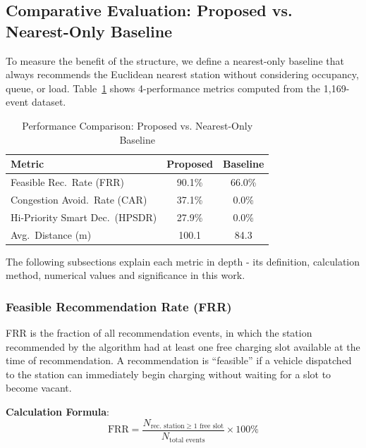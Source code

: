 \documentclass[conference]{IEEEtran}
\begin{document}
\subsection{Comparative Evaluation: Proposed vs. Nearest-Only Baseline}

To measure the benefit of the structure, we define a nearest-only
baseline that always recommends the Euclidean nearest station without
considering occupancy, queue, or load. Table~\ref{tab:comparison} shows
4-performance metrics computed from the 1,169-event dataset.

\begin{table}[htbp]
\caption{Performance Comparison: Proposed vs. Nearest-Only Baseline}
\label{tab:comparison}
\begin{center}
\begin{tabular}{|l|c|c|}
\hline
\textbf{Metric} & \textbf{Proposed} & \textbf{Baseline} \\
\hline
Feasible Rec.\ Rate (FRR)       & 90.1\% & 66.0\% \\
\hline
Congestion Avoid.\ Rate (CAR)   & 37.1\% &  0.0\% \\
\hline
Hi-Priority Smart Dec.\ (HPSDR) & 27.9\% &  0.0\% \\
\hline
Avg.\ Distance (m)              & 100.1  &  84.3  \\
\hline
\end{tabular}
\end{center}
\end{table}

The following subsections explain each metric in depth - its definition,
calculation method, numerical values and significance in this work.

\subsubsection{Feasible Recommendation Rate (FRR)} FRR is the fraction of all recommendation events,
in which the station recommended by the algorithm had at least one free
charging slot available at the time of recommendation. A recommendation
is ``feasible'' if a vehicle dispatched to the station can immediately
begin charging without waiting for a slot to become vacant.

\textbf{Calculation Formula}:
\begin{equation}
  \text{FRR} =
    \frac{N_{\text{rec.\ station} \geq 1 \text{ free slot}}}
         {N_{\text{total events}}}
    \times 100\%
  \label{eq:frr}
\end{equation}
\end{document}
